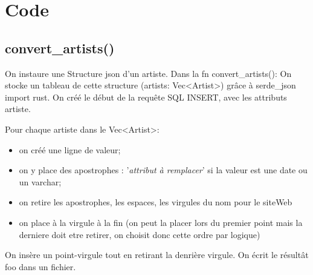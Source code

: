 \documentclass{article}
\begin{document}

\section{Code}

\subsection{convert\_artists()}
\label{sec:convArtists}

\label{text:convArtistsExpl}

On instaure une Structure json d'un artiste.
Dans la fn convert\_artists(): 
On stocke un tableau de cette structure (artists: Vec<Artist>) grâce à serde\_json import rust.
On créé le début de la requête SQL INSERT, avec les attributs artiste.

Pour chaque artiste dans le Vec<Artist>:
\begin{itemize}[label=\(\blacktriangleright\)]
    \item on créé une ligne de valeur;
    \item on y place des apostrophes : '\emph{attribut à remplacer}' si la valeur est une date ou un varchar;
    \item on retire les apostrophes, les espaces, les virgules du nom pour le siteWeb
    \item on place à la virgule à la fin (on peut la placer lors du premier point mais la derniere doit etre retirer, on choisit donc cette ordre par logique)
\end{itemize}

On insère un point-virgule tout en retirant la denrière virgule.
On écrit le résultât foo dans un fichier.
\end{document}
